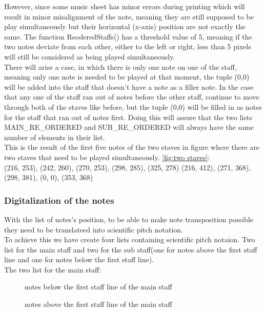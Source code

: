 \documentclass[final]{cvpr}
\begin{document}
However, since some music sheet has  minor errors during printing which will result in minor
misalignment of the note, meaning they are still supposed to be play
simultaneously but their horizontal (x-axis) position are not exactly the
same. The function ReoderedStaffs() has a threshold value of 5, meaning if
the two notes deviate from each other, either to the left or right, less than
5 pixels will still be considered as being played simultaneously.\\

There will arise a case, in which there is only one note on one of the staff, meaning
only one note is needed to be played at that moment, the tuple (0,0) will be added
into the staff that doesn't have a note as a filler note. In the case that any one of the
staff ran out of notes before the other staff, continue to move through both of the
staves like before, but the tuple (0,0) will be filled in as notes for the staff that ran out of notes first.
Doing this will assure that the two lists MAIN\_RE\_ORDERED and SUB\_RE\_ORDERED will
always have the same number of elements in their list.\\

\noindent This is the result of the first five notes of the two staves in figure 
where there are two staves that need to be played simultaneously.
\ref{fig:two staves}:\\

\noindent(216, 253), (242, 260), (270, 253), (298, 285), (325, 278)
         (216, 412), (271, 368), (298, 381), (0, 0), \hfill    (353, 368)


\subsubsection{Digitalization of the notes}
With the list of notes's position, to be able to make note transposition possible
they need to be translateed into scientific pitch notation.\\

To achieve this we have create four lists containing scientific pitch notaion.
Two list for the main staff and two for the sub staff(one for notes above the
first staff line and one for notes below the first staff line).\\

The two list for the main staff:
\begin{figure}[h]
['E5','D5','C5','B4','A4','G4','F4','E4','D4','C4',' B3','A3,
'G3','F3','E3','D3','C3']
\caption{notes below the first staff line of the main staff}
\vspace{\baselineskip}
\makebox[\columnwidth]{['E5','F5','G5','A5','B5','C6','D6','E6','F6','G6']}
\caption{notes above the first staff line of the main staff}
\end{figure}
\end{document}
